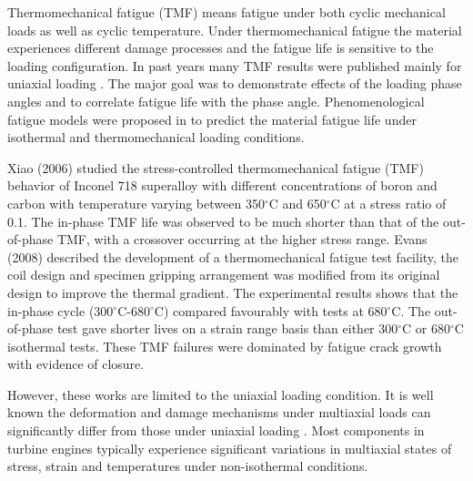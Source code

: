 Thermomechanical fatigue (TMF) means fatigue under both cyclic mechanical loads as well as cyclic temperature. Under thermomechanical fatigue the material experiences different damage processes and the fatigue life is sensitive to the loading configuration. In past years many TMF results were published mainly for uniaxial loading \cite{Evans2008, Kulawinski2015, remy2003thermal, Bauer2009}. The major goal was to demonstrate effects of the loading phase angles and to correlate fatigue life with the phase angle. Phenomenological fatigue models were proposed in \cite{Vose2013} to predict the material fatigue life under isothermal and thermomechanical loading conditions. 

Xiao (2006) \cite{Xiao2006157} studied the stress-controlled thermomechanical fatigue (TMF) behavior of Inconel 718 superalloy with different concentrations of boron and carbon with temperature varying between 350$^{\circ}$C and 650$^{\circ}$C at a stress ratio of 0.1. The in-phase TMF life was observed to be much shorter than that of the out-of-phase TMF, with a crossover occurring at the higher stress range.
Evans (2008) \cite{evans2008thermo} described the development of a thermomechanical fatigue test facility, the coil design and specimen gripping arrangement was modified from its original design to improve the thermal gradient.
The experimental results shows that the in-phase cycle (300$^{\circ}$C-680$^{\circ}$C) compared favourably with tests at 680$^{\circ}$C.
The out-of-phase test gave shorter lives on a strain range basis than either 300$^{\circ}$C or 680$^{\circ}$C isothermal tests.
These TMF failures were dominated by fatigue crack growth with evidence of closure.

However, these works are limited to the uniaxial loading condition.
It is well known the deformation and damage mechanisms under multiaxial loads can significantly differ from those under uniaxial loading \cite{fang2015cyclic, kang2004uniaxial, chen2004modified}. Most components in turbine engines typically experience significant variations in multiaxial states of stress, strain and temperatures under non-isothermal conditions. 

